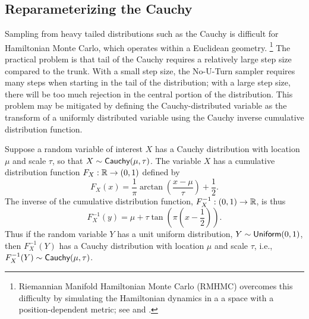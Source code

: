 \subsection{Reparameterizing the Cauchy}

Sampling from heavy tailed distributions such as the Cauchy is
difficult for Hamiltonian Monte Carlo, which operates within a
Euclidean geometry.%
\footnote{Riemannian Manifold Hamiltonian Monte Carlo (RMHMC) overcomes
  this difficulty by simulating the Hamiltonian dynamics in a a space
  with a position-dependent metric; see
  \citep{GirolamiCalderhead:2011} and \citep{Betancourt:2012}.}
%
The practical problem is that tail of the Cauchy
requires a relatively large step size compared to the trunk.  With a
small step size, the No-U-Turn sampler requires many steps when
starting in the tail of the distribution; with a large step size,
there will be too much rejection in the central portion of the
distribution.  This problem may be mitigated by defining the
Cauchy-distributed variable as the transform of a uniformly
distributed variable using the Cauchy inverse cumulative distribution
function.

Suppose a random variable of interest $X$ has a Cauchy distribution
with location $\mu$ and scale $\tau$, so that $X \sim
\mbox{\sf Cauchy}(\mu,\tau)$.  The variable $X$ has a cumulative
distribution function $F_X:\mathbb{R} \rightarrow (0,1)$ defined by
\[
F_X(x) = \frac{1}{\pi} \arctan \left( \frac{x - \mu}{\tau} \right) +
\frac{1}{2}.
\]
The inverse of the cumulative distribution function,
$F_X^{-1}:(0,1) \rightarrow \mathbb{R}$, is thus
%
\[
F^{-1}_X(y) = \mu + \tau \tan \left( \pi \left( x - \frac{1}{2} \right) \right).
\]
Thus if the random variable $Y$ has a unit uniform distribution, $Y
\sim \mbox{\sf Uniform}(0,1)$, then $F^{-1}_X(Y)$ has a Cauchy
distribution with location $\mu$ and scale $\tau$, i.e., $F^{-1}_X(Y) \sim
\mbox{\sf Cauchy}(\mu,\tau)$. 

